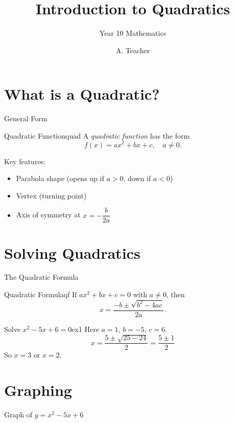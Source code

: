 \documentclass{cherwellmaths}
\title{Introduction to Quadratics}
\subtitle{Year 10 Mathematics}
\author{A. Teacher}
\begin{document}
\section{What is a Quadratic?}

\begin{frame}{General Form}
  \begin{defn}{Quadratic Function}{quad}
    A \emph{quadratic function} has the form
    \[
      f(x) = ax^2 + bx + c, \quad a \neq 0.
    \]
  \end{defn}

  \pause
  Key features:
  \begin{itemize}
    \item Parabola shape (opens up if $a > 0$, down if $a < 0$)
    \item Vertex (turning point)
    \item Axis of symmetry at $x = -\dfrac{b}{2a}$
  \end{itemize}
\end{frame}

\section{Solving Quadratics}

\begin{frame}{The Quadratic Formula}
  \begin{thm*}{Quadratic Formula}{qf}
    If $ax^2 + bx + c = 0$ with $a \neq 0$, then
    \[
      x = \frac{-b \pm \sqrt{b^2 - 4ac}}{2a}.
    \]
  \end{thm*}

  \pause
  \begin{exmp}{Solve $x^2 - 5x + 6 = 0$}{ex1}
    Here $a=1$, $b=-5$, $c=6$.
    \[
      x = \frac{5 \pm \sqrt{25 - 24}}{2} = \frac{5 \pm 1}{2}
    \]
    So $x = 3$ or $x = 2$.
  \end{exmp}
\end{frame}

\section{Graphing}

\begin{frame}{Graph of $y = x^2 - 5x + 6$}
  \centering
\end{frame}
\end{document}
